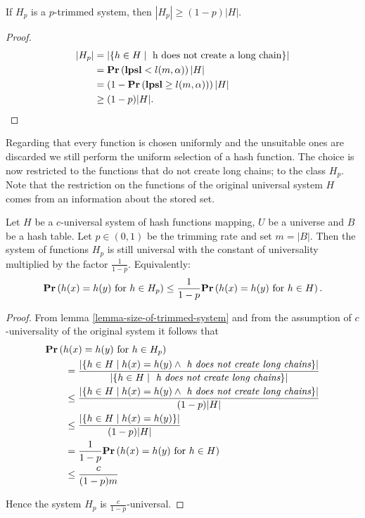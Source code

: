 \begin{lemma}
\label{lemma-size-of-trimmed-system}
If $H_p$ is a $p$-trimmed system, then $|H_p| \geq (1 - p)|H|$.
\end{lemma}
\begin{proof}
\[
\begin{split}
|H_p|
	& = |\lbrace h \in H \mid \text{ h does not create a long chain} \rbrace| \\
	& =\mathbf{Pr}\left(\mathbf{lpsl} < l(m, \alpha)\right) |H| \\
	& = \left(1 - \mathbf{Pr}\left(\mathbf{lpsl} \geq l(m, \alpha)\right)\right) |H| \\
	& \geq (1 - p)|H| \text{.}
\end{split}
\]
\end{proof}

Regarding that every function is chosen uniformly and the unsuitable ones are discarded we still perform the uniform selection of a hash function. The choice is now restricted to the functions that do not create long chains; to the class $H_p$. Note that the restriction on the functions of the original universal system $H$ comes from an information about the stored set.

\begin{theorem}
\label{theorem-p-trimmed-is-universal}
Let $H$ be a $c$-universal system of hash functions mapping, $U$ be a universe and $B$ be a hash table. Let $p \in (0, 1)$ be the trimming rate and set $m = |B|$. Then the system of functions $H_p$ is still universal with the constant of universality multiplied by the factor $\frac{1}{1 - p}$. Equivalently:
\[
	\mathbf{Pr}\left(h(x) = h(y) \text{ for } h \in H_p\right) \leq \frac{1}{1 - p} \mathbf{Pr}\left(h(x) = h(y) \text{ for } h \in H\right) \text{.}
\]
\end{theorem}
\begin{proof}
From lemma \ref{lemma-size-of-trimmed-system} and from the assumption of $c$-universality of the original system it follows that 
\[
\begin{split}
& \mathbf{Pr}\left(h(x) = h(y) \text{ for } h \in H_p\right)  \\
	& \qquad =  \frac{|\{ h \in H \mid h(x) = h(y) \wedge \textit{ h does not create long chains} \}|}{|\lbrace h \in H \mid \textit{ h does not create long chains} \rbrace|} \\
	& \qquad \leq \frac{|\{ h \in H \mid h(x) = h(y) \wedge \textit{ h does not create long chains} \}|}{(1 - p)|H|} \\ 
	& \qquad \leq \frac{|\{ h \in H \mid h(x) = h(y) \}|}{(1 - p)|H|} \\
	& \qquad = \frac{1}{1 - p} \mathbf{Pr}\left(h(x) = h(y) \text{ for } h \in H\right) \\
	& \qquad \leq \frac{c}{(1 - p) m} \\
\end{split}
\]

Hence the system $H_p$ is $\frac{c}{1 - p}$-universal.
\end{proof}

